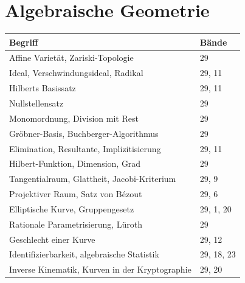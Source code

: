 \section*{Algebraische Geometrie}
\nopagebreak
{\small\renewcommand{\arraystretch}{1.32}
\begin{longtable}{@{}P{5.6cm}P{2.8cm}@{}}
\toprule
\textbf{Begriff} & \textbf{Bände}\\
\midrule
\endhead
Affine Varietät, Zariski-Topologie & 29\\
Ideal, Verschwindungsideal, Radikal & 29, 11\\
Hilberts Basissatz & 29, 11\\
Nullstellensatz & 29\\
Monomordnung, Division mit Rest & 29\\
Gröbner-Basis, Buchberger-Algorithmus & 29\\
Elimination, Resultante, Implizitisierung & 29, 11\\
Hilbert-Funktion, Dimension, Grad & 29\\
Tangentialraum, Glattheit, Jacobi-Kriterium & 29, 9\\
Projektiver Raum, Satz von Bézout & 29, 6\\
Elliptische Kurve, Gruppengesetz & 29, 1, 20\\
Rationale Parametrisierung, Lüroth & 29\\
Geschlecht einer Kurve & 29, 12\\
Identifizierbarkeit, algebraische Statistik & 29, 18, 23\\
Inverse Kinematik, Kurven in der Kryptographie & 29, 20\\
\bottomrule
\end{longtable}}
